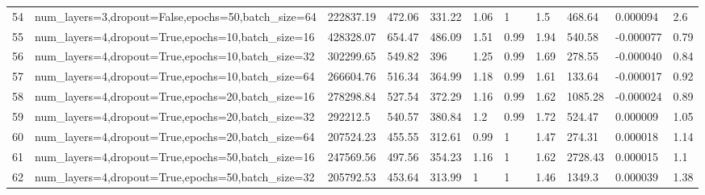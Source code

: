 \begin{longtable}{C{0.8cm} L{2cm} C{1.15cm} C{1.15cm} C{1.15cm} C{1.15cm} C{0.85cm} C{1.25cm} C{1.2cm} C{1.5cm} C{1.0cm}}
54 & num\_layers=3,\newline dropout=False,\newline epochs=50,\newline batch\_size=64 & 222837.19 & 472.06 & 331.22 & 1.06 & 1 & 1.5 & 468.64 & 0.000094 & 2.6 \\
55 & num\_layers=4,\newline dropout=True,\newline epochs=10,\newline batch\_size=16 & 428328.07 & 654.47 & 486.09 & 1.51 & 0.99 & 1.94 & 540.58 & -0.000077 & 0.79 \\
56 & num\_layers=4,\newline dropout=True,\newline epochs=10,\newline batch\_size=32 & 302299.65 & 549.82 & 396 & 1.25 & 0.99 & 1.69 & 278.55 & -0.000040 & 0.84 \\
57 & num\_layers=4,\newline dropout=True,\newline epochs=10,\newline batch\_size=64 & 266604.76 & 516.34 & 364.99 & 1.18 & 0.99 & 1.61 & 133.64 & -0.000017 & 0.92 \\
58 & num\_layers=4,\newline dropout=True,\newline epochs=20,\newline batch\_size=16 & 278298.84 & 527.54 & 372.29 & 1.16 & 0.99 & 1.62 & 1085.28 & -0.000024 & 0.89 \\
59 & num\_layers=4,\newline dropout=True,\newline epochs=20,\newline batch\_size=32 & 292212.5 & 540.57 & 380.84 & 1.2 & 0.99 & 1.72 & 524.47 & 0.000009 & 1.05 \\
60 & num\_layers=4,\newline dropout=True,\newline epochs=20,\newline batch\_size=64 & 207524.23 & 455.55 & 312.61 & 0.99 & 1 & 1.47 & 274.31 & 0.000018 & 1.14 \\
61 & num\_layers=4,\newline dropout=True,\newline epochs=50,\newline batch\_size=16 & 247569.56 & 497.56 & 354.23 & 1.16 & 1 & 1.62 & 2728.43 & 0.000015 & 1.1 \\
62 & num\_layers=4,\newline dropout=True,\newline epochs=50,\newline batch\_size=32 & 205792.53 & 453.64 & 313.99 & 1 & 1 & 1.46 & 1349.3 & 0.000039 & 1.38 \\

\end{longtable}
